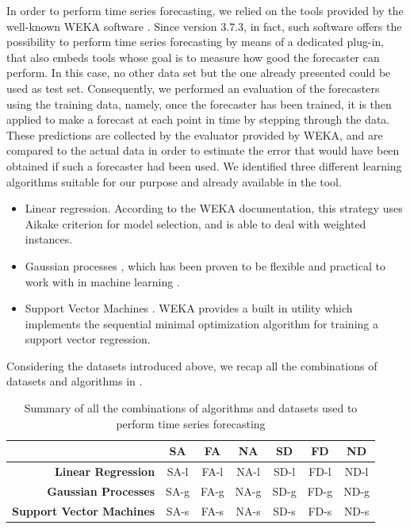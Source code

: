 \documentclass[12pt,a4paper,twoside,openright]{book}
\begin{document}
In order to perform time series forecasting, we relied on the tools provided by the well-known WEKA software \cite{hall2009}.
%
Since version 3.7.3, in fact, such software offers the possibility to perform time series forecasting by means of a dedicated plug-in, that also embeds tools whose goal is to measure how good the forecaster can perform.
%
In this case, no other data set but the one already presented could be used as test set.
%
Consequently, we performed an evaluation of the forecasters using the training data, namely, once the forecaster has been trained, it is then applied to make a forecast at each point in time by stepping through the data.
%
These predictions are collected by the evaluator provided by WEKA, and are compared to the actual data in order to estimate the error that would have been obtained if such a forecaster had been used.
%
We identified three different learning algorithms suitable for our purpose and already available in the tool.
\begin{itemize}
 \item Linear regression. According to the WEKA documentation, this strategy uses Aikake criterion \cite{aikake1974} for model selection, and is able to deal with weighted instances.
 \item Gaussian processes \cite{mackay1998}, which has been proven to be flexible and practical to work with in machine learning \cite{rasmussen2004}.
 \item Support Vector Machines \cite{cortes1995}. WEKA provides a built in utility which implements the sequential minimal optimization algorithm \cite{smola2004, keerthi2001} for training a support vector regression.
\end{itemize}
%
Considering the datasets introduced above, we recap all the combinations of datasets and algorithms in .
%
\begin{table}[!htb]
\begin{center}
\begin{tabular}{r | c | c | c | c | c | c }
 & \textbf{SA} & \textbf{FA} & \textbf{NA}  & \textbf{SD} & \textbf{FD} & \textbf{ND} \\
\hline
\hline
\textbf{Linear Regression} & SA-l & FA-l & NA-l & SD-l & FD-l & ND-l \\
\hline
\textbf{Gaussian Processes} & SA-g & FA-g & NA-g & SD-g & FD-g & ND-g \\
\hline
\textbf{Support Vector Machines} & SA-s & FA-s & NA-s & SD-s & FD-s & ND-s \\
\hline
\hline
\end{tabular}
\caption[Combinations of algorithms and datasets]{Summary of all the combinations of algorithms and datasets used to perform time series forecasting}
\label{tab:algorithms}
\end{center}
\end{table}
\end{document}
